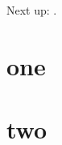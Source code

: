 \documentclass{grattan}
\begin{document}
Next up: .
\chapter{one}\label{chap:1}
\chapter{two}\label{chap:2}
\end{document}

